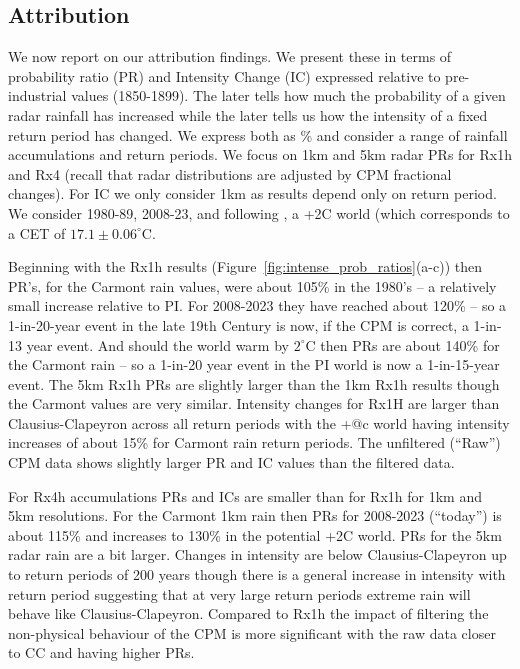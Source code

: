 \documentclass[11pt,a4paper]{article}
\begin{document}
\subsection{Attribution}
\label{subsect:attribution}
We now report on our attribution findings. We present these in terms of probability ratio (PR) and  Intensity Change (IC) expressed relative to pre-industrial values (1850-1899). The later tells how much the probability of a given radar rainfall has increased while the later tells us how the intensity of a fixed  return period has changed. We express both as \% and consider a range of rainfall accumulations and return periods. We focus on 1km and 5km radar PRs for Rx1h and Rx4 (recall that radar distributions are adjusted by CPM fractional changes).  For IC we only consider 1km as results depend only on return period.  We consider 1980-89, 2008-23, and following \cite{tett2023edinburgh}, a +2C world (which corresponds to a CET of $17.1 \pm 0.06 ^\circ$C.  

Beginning with the Rx1h results (Figure~\ref{fig:intense_prob_ratios}(a-c)) then PR's, for the Carmont rain values,  were about 105\% in the 1980's -- a relatively small increase relative to PI. For 2008-2023 they have reached about 120\% -- so a 1-in-20-year event in the late 19th Century is now, if the CPM is correct, a 1-in-13 year event.  And should the world warm by $2^\circ$C then PRs are about 140\% for the Carmont rain -- so a 1-in-20 year event in the PI world is now a 1-in-15-year event. The 5km Rx1h PRs are slightly larger than the 1km Rx1h results though the Carmont values are very similar. Intensity changes for Rx1H are larger than Clausius-Clapeyron across all return periods with the +@c world having intensity increases of about 15\% for Carmont rain return periods. The unfiltered (``Raw'') CPM data  shows slightly larger PR and IC values than the filtered data.

For Rx4h accumulations PRs and ICs are smaller than for Rx1h for 1km and 5km resolutions. For the Carmont 1km  rain then PRs for 2008-2023 (``today'') is about  115\% and increases to 130\% in the potential +2C world. PRs for the 5km radar rain are a bit larger.  Changes in intensity are below Clausius-Clapeyron  up to return periods of 200 years though there is a general increase in intensity with return period suggesting that at very large return periods extreme rain will behave like   Clausius-Clapeyron. Compared to Rx1h the impact of filtering the non-physical behaviour of the CPM is more significant with the raw data closer to  CC  and having higher PRs. 
\end{document}
